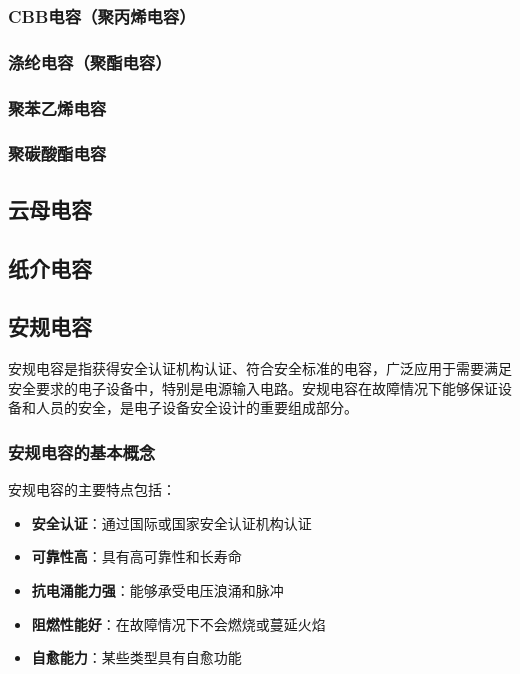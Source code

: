 \documentclass[12pt,UTF8]{ctexbook}
\begin{document}
\subsubsection{CBB电容（聚丙烯电容）}

\subsubsection{涤纶电容（聚酯电容）}

\subsubsection{聚苯乙烯电容}

\subsubsection{聚碳酸酯电容}

\subsection{云母电容}

\subsection{纸介电容}

\subsection{安规电容}

安规电容是指获得安全认证机构认证、符合安全标准的电容，广泛应用于需要满足安全要求的电子设备中，特别是电源输入电路。安规电容在故障情况下能够保证设备和人员的安全，是电子设备安全设计的重要组成部分。

\subsubsection{安规电容的基本概念}

安规电容的主要特点包括：

\begin{itemize}[leftmargin=2cm]
    \item \textbf{安全认证}：通过国际或国家安全认证机构认证
    \item \textbf{可靠性高}：具有高可靠性和长寿命
    \item \textbf{抗电涌能力强}：能够承受电压浪涌和脉冲
    \item \textbf{阻燃性能好}：在故障情况下不会燃烧或蔓延火焰
    \item \textbf{自愈能力}：某些类型具有自愈功能
\end{itemize}
\end{document}
